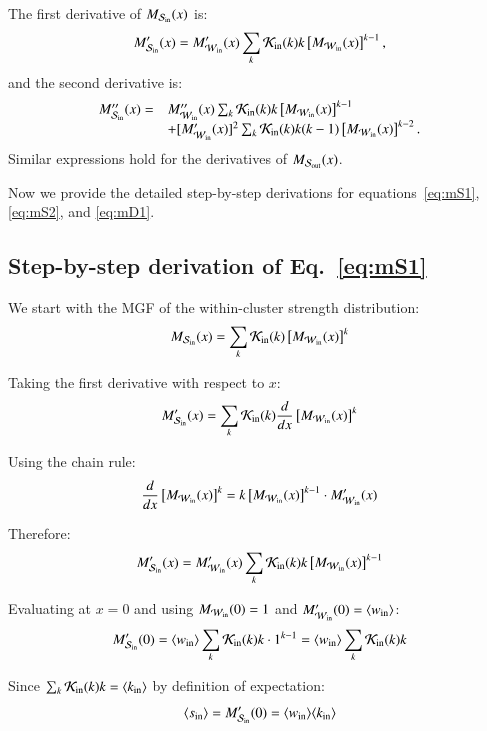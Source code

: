 \documentclass[a4paper,pre,superscriptaddress,floatfix,nofootinbib,twocolumn]{revtex4-1}
\begin{document}
The first derivative of $M_{{\cal S}_\text{in}}(x)$ is:
\[
M'_{{\cal S}_\text{in}}(x) = M'_{{\cal W}_\text{in}}(x) \sum_{k} {\cal K}_\text{in}(k) k \left[ M_{{\cal W}_\text{in}}(x) \right]^{k-1},
\]
and the second derivative is:
\[
\begin{array}{ll}
M''_{{\cal S}_\text{in}}(x) = & M''_{{\cal W}_\text{in}}(x) \sum_{k} {\cal K}_\text{in}(k) k \left[ M_{{\cal W}_\text{in}}(x) \right]^{k-1} \\
& + [M'_{{\cal W}_\text{in}}(x)]^2 \sum_{k} {\cal K}_\text{in}(k) k(k-1) \left[ M_{{\cal W}_\text{in}}(x) \right]^{k-2}.
\end{array}
\]
Similar expressions hold for the derivatives of $M_{{\cal S}_\text{out}}(x)$.

Now we provide the detailed step-by-step derivations for equations~\eqref{eq:mS1}, \eqref{eq:mS2}, and \eqref{eq:mD1}.

\subsection*{Step-by-step derivation of Eq.~\eqref{eq:mS1}}

We start with the MGF of the within-cluster strength distribution:
\[
M_{{\cal S}_\text{in}}(x) = \sum_{k} {\cal K}_\text{in}(k) \left[ M_{{\cal W}_\text{in}}(x) \right]^k
\]

Taking the first derivative with respect to $x$:
\[
M'_{{\cal S}_\text{in}}(x) = \sum_{k} {\cal K}_\text{in}(k) \frac{d}{dx}\left[ M_{{\cal W}_\text{in}}(x) \right]^k
\]

Using the chain rule:
\[
\frac{d}{dx}\left[ M_{{\cal W}_\text{in}}(x) \right]^k = k \left[ M_{{\cal W}_\text{in}}(x) \right]^{k-1} \cdot M'_{{\cal W}_\text{in}}(x)
\]

Therefore:
\[
M'_{{\cal S}_\text{in}}(x) = M'_{{\cal W}_\text{in}}(x) \sum_{k} {\cal K}_\text{in}(k) k \left[ M_{{\cal W}_\text{in}}(x) \right]^{k-1}
\]

Evaluating at $x = 0$ and using $M_{{\cal W}_\text{in}}(0) = 1$ and $M'_{{\cal W}_\text{in}}(0) = \langle w_\text{in} \rangle$:
\[
M'_{{\cal S}_\text{in}}(0) = \langle w_\text{in} \rangle \sum_{k} {\cal K}_\text{in}(k) k \cdot 1^{k-1} = \langle w_\text{in} \rangle \sum_{k} {\cal K}_\text{in}(k) k
\]

Since $\sum_{k} {\cal K}_\text{in}(k) k = \langle k_{\text{in}} \rangle$ by definition of expectation:
\[
\langle s_\text{in} \rangle = M'_{{\cal S}_\text{in}}(0) = \langle w_\text{in} \rangle \langle k_{\text{in}} \rangle
\]
\end{document}

